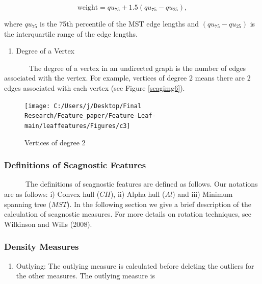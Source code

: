 \documentclass{article}
\begin{document}
\begin{equation}
    \text{weight} = qu_{75} + 1.5(qu_{75} - qu_{25}),
    \label{w1}
\end{equation}

where \(qu_{75}\) is the 75th percentile of the MST edge lengths and
\((qu_{75} - qu_{25})\) is the interquartile range of the edge lengths.

\begin{enumerate}
\def\labelenumi{\roman{enumi})}
\setcounter{enumi}{2}
\tightlist
\item
  Degree of a Vertex
\end{enumerate}

~~~~~~~The degree of a vertex in an undirected graph is the number of
edges associated with the vertex. For example, vertices of degree 2
means there are 2 edges associated with each vertex (see Figure
\ref{scagimg6}).

\begin{figure}[!ht]

{\centering \texttt{[image: C:/Users/j/Desktop/Final Research/Feature\_paper/Feature-Leaf-main/leaffeatures/Figures/c3]} 

}

\caption{\label{scagimg6}Vertices of degree 2}\label{fig:unnamed-chunk-33}
\end{figure}

\hypertarget{definitions-of-scagnostic-features}{%
\subsubsection{Definitions of Scagnostic
Features}\label{definitions-of-scagnostic-features}}

~~~~~~The definitions of scagnostic features are defined as follows. Our
notations are as follows: i) Convex hull (\(CH\)), ii) Alpha hull
(\(Al\)) and iii) Minimum spanning tree (\(MST\)). In the following
section we give a brief description of the calculation of scagnostic
measures. For more details on rotation techniques, see Wilkinson and
Wills (2008).

\hypertarget{density-measures}{%
\subsubsection{Density Measures}\label{density-measures}}

\begin{enumerate}
\def\labelenumi{\roman{enumi})}
\tightlist
\item
  Outlying: The outlying measure is calculated before deleting the
  outliers for the other measures. The outlying measure is
\end{enumerate}
\end{document}
